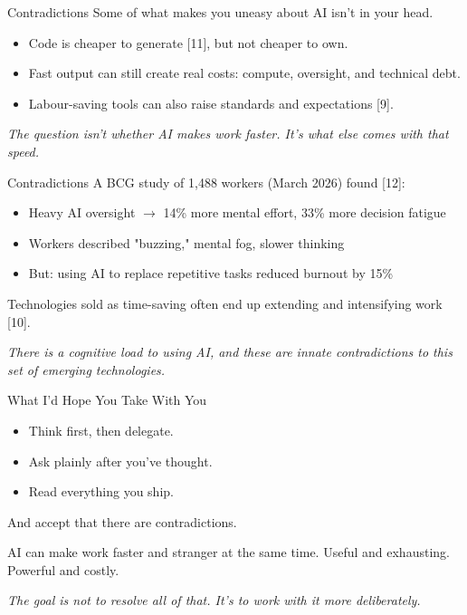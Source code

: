 \documentclass{beamer}
\begin{document}
\begin{frame}{Contradictions}
Some of what makes you uneasy about AI isn't in your head.

\vspace{1em}
\begin{itemize}
    \item Code is cheaper to generate [11], but not cheaper to own. 
    \item Fast output can still create real costs: compute, oversight, and technical debt.
    \item Labour-saving tools can also raise standards and expectations [9].
\end{itemize}

\vspace{1em}
\textit{The question isn't whether AI makes work faster. It's what else comes with that speed.}
\end{frame}

\begin{frame}{Contradictions}
\small
A BCG study of 1,488 workers (March 2026) found [12]:
\begin{itemize}
    \item Heavy AI oversight $\rightarrow$ 14\% more mental effort, 33\% more decision fatigue
    \item Workers described "buzzing," mental fog, slower thinking
    \item But: using AI to replace repetitive tasks reduced burnout by 15\%
\end{itemize}

\vspace{0.8em}
Technologies sold as time-saving often end up extending and intensifying work [10].

\vspace{0.8em}
\textit{There is a cognitive load to using AI, and these are innate contradictions to this set of emerging technologies.}
\end{frame}

\begin{frame}{What I'd Hope You Take With You}
\begin{itemize}
    \item Think first, then delegate.
    \item Ask plainly after you've thought.
    \item Read everything you ship.
\end{itemize}

\vspace{1em}
And accept that there are contradictions.

\vspace{0.8em}
AI can make work faster and stranger at the same time.
Useful and exhausting. Powerful and costly.

\vspace{0.8em}
\textit{The goal is not to resolve all of that. It's to work with it more deliberately.}
\end{frame}
\end{document}
